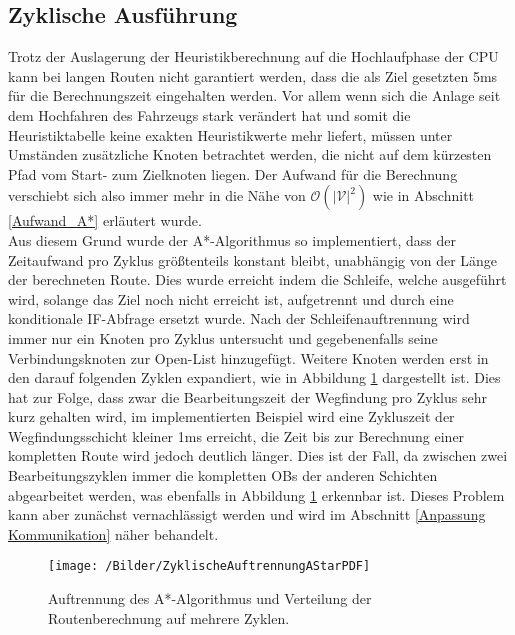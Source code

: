 		\subsection{Zyklische Ausführung}
			\label{zyklische Auftrennung}
			Trotz der Auslagerung der Heuristikberechnung auf die Hochlaufphase der CPU kann bei langen Routen nicht garantiert werden, dass die als Ziel gesetzten 5ms für die Berechnungszeit eingehalten werden. Vor allem wenn sich die Anlage seit dem Hochfahren des Fahrzeugs stark verändert hat und somit die Heuristiktabelle keine exakten Heuristikwerte mehr liefert, müssen unter Umständen zusätzliche Knoten betrachtet werden, die nicht auf dem kürzesten Pfad vom Start- zum Zielknoten liegen. Der Aufwand für die Berechnung verschiebt sich also immer mehr in die Nähe von $\mathcal{O}(|\mathcal{V}|^2)$ wie in Abschnitt \ref{Aufwand_A*} erläutert wurde.
			\\[4pt]		
			Aus diesem Grund wurde der A*-Algorithmus so implementiert, dass der Zeitaufwand pro Zyklus größtenteils konstant bleibt, unabhängig von der Länge der berechneten Route. Dies wurde erreicht indem die Schleife, welche ausgeführt wird, solange das Ziel noch nicht erreicht ist, aufgetrennt und durch eine konditionale IF-Abfrage ersetzt wurde. Nach der Schleifenauftrennung wird immer nur ein Knoten pro Zyklus untersucht und gegebenenfalls seine Verbindungsknoten zur Open-List hinzugefügt. Weitere Knoten werden erst in den darauf folgenden Zyklen expandiert, wie in Abbildung \ref{Schleifenaufteilung} dargestellt ist. Dies hat zur Folge, dass zwar die Bearbeitungszeit der Wegfindung pro Zyklus sehr kurz gehalten wird, im implementierten Beispiel wird eine Zykluszeit der Wegfindungsschicht kleiner 1ms erreicht, die Zeit bis zur Berechnung einer kompletten Route wird jedoch deutlich länger. Dies ist der Fall, da zwischen zwei Bearbeitungszyklen immer die kompletten \ac{OB}s der anderen Schichten abgearbeitet werden, was ebenfalls in Abbildung \ref{Schleifenaufteilung} erkennbar ist. Dieses Problem kann aber zunächst vernachlässigt werden und wird im Abschnitt \ref{Anpassung Kommunikation} näher behandelt.
		
			
			\begin{figure}[h]
				\centering
				\texttt{[image: /Bilder/ZyklischeAuftrennungAStarPDF]}
				\vspace{0.2cm}
				\caption{Auftrennung des A*-Algorithmus und Verteilung der Routenberechnung auf mehrere Zyklen.}\label{Schleifenaufteilung}
			\end{figure}
			
